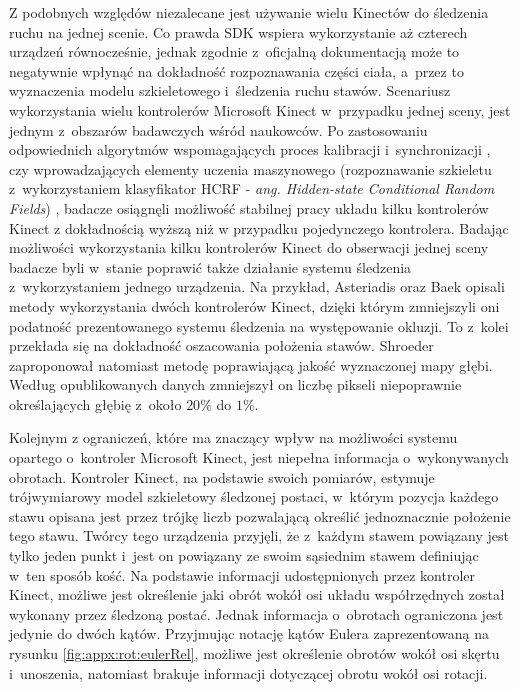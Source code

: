 Z podobnych względów niezalecane jest używanie wielu Kinectów do śledzenia ruchu na jednej scenie. Co prawda SDK wspiera wykorzystanie aż czterech urządzeń równocześnie, jednak zgodnie z~oficjalną dokumentacją może to negatywnie wpłynąć na dokładność rozpoznawania części ciała, a~przez to wyznaczenia modelu szkieletowego i~śledzenia ruchu stawów{}. Scenariusz wykorzystania wielu kontrolerów Microsoft Kinect w~przypadku jednej sceny, jest jednym z~obszarów badawczych wśród naukowców. Po zastosowaniu odpowiednich algorytmów wspomagających proces kalibracji i~synchronizacji \cite{Kohno2013}, czy wprowadzających elementy uczenia maszynowego (rozpoznawanie szkieletu z~wykorzystaniem klasyfikator HCRF - \emph{ang. Hidden-state Conditional Random Fields}) \cite{Kitsikidis2011}, badacze osiągnęli możliwość stabilnej pracy układu kilku kontrolerów Kinect z dokładnością wyższą niż w przypadku pojedynczego kontrolera. Badając możliwości wykorzystania kilku kontrolerów Kinect do obserwacji jednej sceny badacze byli w~stanie poprawić także działanie systemu śledzenia z~wykorzystaniem jednego urządzenia. Na przykład, Asteriadis \cite{Asteriadis2013} oraz Baek \cite{Baek2014} opisali metody wykorzystania dwóch kontrolerów Kinect, dzięki którym zmniejszyli oni podatność prezentowanego systemu śledzenia na występowanie okluzji. To z~kolei przekłada się na dokładność oszacowania położenia stawów. Shroeder \cite{Schroder2011} zaproponował natomiast metodę poprawiającą jakość wyznaczonej mapy głębi. Według opublikowanych danych zmniejszył on liczbę pikseli niepoprawnie określających głębię z~około $20\%$ do $1\%$.

Kolejnym z ograniczeń, które ma znaczący wpływ na możliwości systemu opartego o~kontroler Microsoft Kinect, jest niepełna informacja o~wykonywanych obrotach. Kontroler Kinect, na podstawie swoich pomiarów, estymuje trójwymiarowy model szkieletowy śledzonej postaci, w~którym pozycja każdego stawu opisana jest przez trójkę liczb pozwalającą określić jednoznacznie położenie tego stawu. Twórcy tego urządzenia przyjęli, że z~każdym stawem powiązany jest tylko jeden punkt i~jest on powiązany ze swoim sąsiednim stawem definiując w~ten sposób kość. Na podstawie informacji udostępnionych przez kontroler Kinect, możliwe jest określenie jaki obrót wokół osi układu współrzędnych został wykonany przez śledzoną postać. Jednak informacja o~obrotach ograniczona jest jedynie do dwóch kątów. Przyjmując notację kątów Eulera zaprezentowaną na rysunku \ref{fig:appx:rot:eulerRel}, możliwe jest określenie obrotów wokół osi skęrtu i~unoszenia, natomiast brakuje informacji dotyczącej obrotu wokół osi rotacji.

